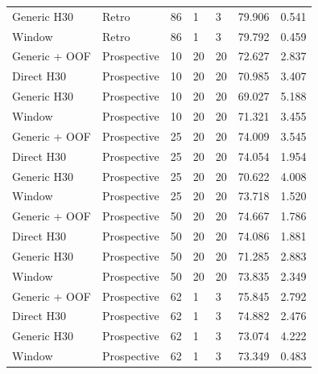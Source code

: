 {\begin{longtable}{p{}p{}p{}p{}p{}p{}p{}}
Generic H30 & Retro & 86 & 1 & 3 & 79.906 & 0.541 \\
Window & Retro & 86 & 1 & 3 & 79.792 & 0.459 \\
Generic + OOF & Prospective & 10 & 20 & 20 & 72.627 & 2.837 \\
Direct H30 & Prospective & 10 & 20 & 20 & 70.985 & 3.407 \\
Generic H30 & Prospective & 10 & 20 & 20 & 69.027 & 5.188 \\
Window & Prospective & 10 & 20 & 20 & 71.321 & 3.455 \\
Generic + OOF & Prospective & 25 & 20 & 20 & 74.009 & 3.545 \\
Direct H30 & Prospective & 25 & 20 & 20 & 74.054 & 1.954 \\
Generic H30 & Prospective & 25 & 20 & 20 & 70.622 & 4.008 \\
Window & Prospective & 25 & 20 & 20 & 73.718 & 1.520 \\
Generic + OOF & Prospective & 50 & 20 & 20 & 74.667 & 1.786 \\
Direct H30 & Prospective & 50 & 20 & 20 & 74.086 & 1.881 \\
Generic H30 & Prospective & 50 & 20 & 20 & 71.285 & 2.883 \\
Window & Prospective & 50 & 20 & 20 & 73.835 & 2.349 \\
Generic + OOF & Prospective & 62 & 1 & 3 & 75.845 & 2.792 \\
Direct H30 & Prospective & 62 & 1 & 3 & 74.882 & 2.476 \\
Generic H30 & Prospective & 62 & 1 & 3 & 73.074 & 4.222 \\
Window & Prospective & 62 & 1 & 3 & 73.349 & 0.483 \\
\bottomrule
\end{longtable}
}

